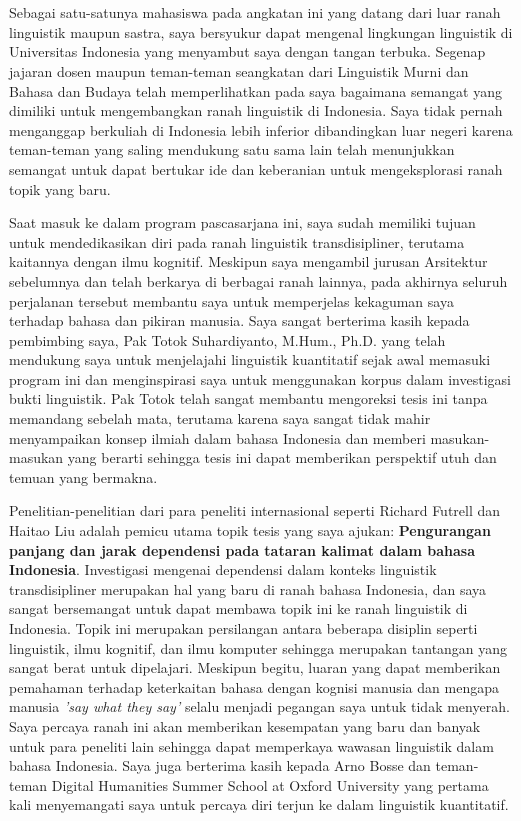 \chapter*{\kataPengantar}

Sebagai satu-satunya mahasiswa pada angkatan ini yang datang dari luar ranah linguistik maupun sastra, saya bersyukur dapat mengenal lingkungan linguistik di Universitas Indonesia yang menyambut saya dengan tangan terbuka. Segenap jajaran dosen maupun teman-teman seangkatan dari Linguistik Murni dan Bahasa dan Budaya telah memperlihatkan pada saya bagaimana semangat yang dimiliki untuk mengembangkan ranah linguistik di Indonesia. Saya tidak pernah menganggap berkuliah di Indonesia lebih inferior dibandingkan luar negeri karena teman-teman yang saling mendukung satu sama lain telah menunjukkan semangat untuk dapat bertukar ide dan keberanian untuk mengeksplorasi ranah topik yang baru.

Saat masuk ke dalam program pascasarjana ini, saya sudah memiliki tujuan untuk mendedikasikan diri pada ranah linguistik transdisipliner, terutama kaitannya dengan ilmu kognitif. Meskipun saya mengambil jurusan Arsitektur sebelumnya dan telah berkarya di berbagai ranah lainnya, pada akhirnya seluruh perjalanan tersebut membantu saya untuk memperjelas kekaguman saya terhadap bahasa dan pikiran manusia. Saya sangat berterima kasih kepada pembimbing saya, Pak Totok Suhardiyanto, M.Hum., Ph.D. yang telah mendukung saya untuk menjelajahi linguistik kuantitatif sejak awal memasuki program ini dan menginspirasi saya untuk menggunakan korpus dalam investigasi bukti linguistik. Pak Totok telah sangat membantu mengoreksi tesis ini tanpa memandang sebelah mata, terutama karena saya sangat tidak mahir menyampaikan konsep ilmiah dalam bahasa Indonesia dan memberi masukan-masukan yang berarti sehingga tesis ini dapat memberikan perspektif utuh dan temuan yang bermakna. 

Penelitian-penelitian dari para peneliti internasional seperti Richard Futrell dan Haitao Liu adalah pemicu utama topik tesis yang saya ajukan: \textbf{Pengurangan panjang dan jarak dependensi pada tataran kalimat dalam bahasa Indonesia}. Investigasi mengenai dependensi dalam konteks linguistik transdisipliner merupakan hal yang baru di ranah bahasa Indonesia, dan saya sangat bersemangat untuk dapat membawa topik ini ke ranah linguistik di Indonesia. Topik ini merupakan persilangan antara beberapa disiplin seperti linguistik, ilmu kognitif, dan ilmu komputer sehingga merupakan tantangan yang sangat berat untuk dipelajari. Meskipun begitu, luaran yang dapat memberikan pemahaman terhadap keterkaitan bahasa dengan kognisi manusia dan mengapa manusia \textit{'say what they say'} selalu menjadi pegangan saya untuk tidak menyerah. Saya percaya ranah ini akan memberikan kesempatan yang baru dan banyak untuk para peneliti lain sehingga dapat memperkaya wawasan linguistik dalam bahasa Indonesia. Saya juga berterima kasih kepada Arno Bosse dan teman-teman Digital Humanities Summer School at Oxford University yang pertama kali menyemangati saya untuk percaya diri terjun ke dalam linguistik kuantitatif. 

